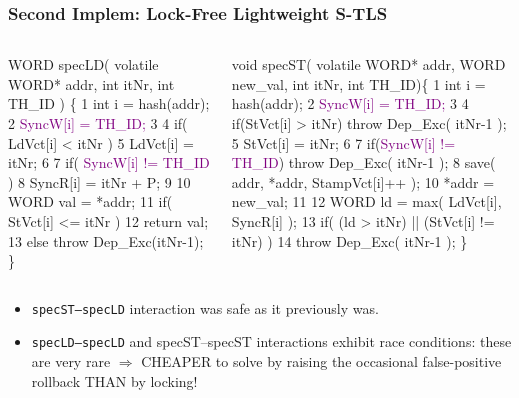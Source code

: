 \documentclass{beamer}
\newcommand{\purple}[1]{\textcolor{Purple}{{#1}}}
\newcommand{\emp}[1]{\textcolor{DikuRed}{ #1}}
\begin{document}
\begin{frame}[fragile,t]
  \frametitle{Second Implem: Lock-Free Lightweight S-TLS}

\begin{columns}
\begin{colorcode}
WORD specLD( volatile WORD* 
addr, int itNr, int TH_ID ) \{ 
1 int i = hash(addr); 
2 \purple{SyncW[i] = TH_ID;} 
3 
4 if( LdVct[i] < itNr )
5     LdVct[i] = itNr; 
6 
7 if( \purple{SyncW[i] != TH_ID} ) 
8   \emp{SyncR[i] = itNr + P;} 
9 
10 WORD val = *addr; 
11 if( StVct[i] <= itNr ) 
12      return val;
13 else throw Dep_Exc(itNr-1);
\} 
\end{colorcode}
\begin{colorcode}
void specST( volatile WORD* addr,
            WORD new_val, int itNr, int TH_ID)\{
1  int i = hash(addr);
2  \purple{SyncW[i] = TH_ID;}
3
4  if(StVct[i] > itNr) throw Dep_Exc( itNr-1 );
5  StVct[i] = itNr;
6
7  if(\purple{SyncW[i] != TH_ID}) \alert{throw Dep_Exc( itNr-1 );}
8  save( addr, *addr, StampVct[i]++ );
10 *addr = new_val;
11
12 WORD ld = \emp{max( LdVct[i], \emp{SyncR[i]} );}
13 if( (\alert{ld > itNr}) || (StVct[i] != itNr) )
14 throw Dep_Exc( itNr-1 ); 
\}
\end{colorcode}
\end{columns}
\medskip\pause

\begin{itemize}
    \item \emp{\tt specST--specLD} interaction was safe as it previously was.\medskip
    \item \emp{\tt specLD--specLD} and \emp{specST--specST} interactions exhibit
            race conditions: these are very rare $\Rightarrow$ CHEAPER to solve by 
            raising the occasional false-positive rollback THAN by locking!
\end{itemize}
\end{frame}
\end{document}
